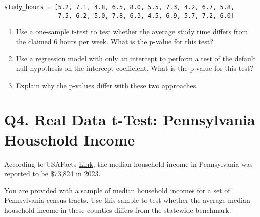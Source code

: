 \documentclass[12pt]{article}
\begin{document}
\begin{verbatim}
study_hours = [5.2, 7.1, 4.8, 6.5, 8.0, 5.5, 7.3, 4.2, 6.7, 5.8, 
               7.5, 6.2, 5.0, 7.8, 6.3, 4.5, 6.9, 5.7, 7.2, 6.0]
\end{verbatim}

\begin{enumerate}[label=\alph*)]
    \item Use a one-sample t-test to test whether the average study time differs from the claimed 6 hours per week. What is the p-value for this test?
    
    \vspace{3cm}
    
    \item Use a regression model with only an intercept to perform a test of the default null hypothesis on the intercept coefficient. What is the p-value for this test?
    
    \vspace{3cm}
    
    \item Explain why the p-values differ with these two approaches.
    
    \vspace{3cm}
\end{enumerate}

\section*{Q4. Real Data t-Test: Pennsylvania Household Income}

According to USAFacts 
\href{https://usafacts.org/answers/what-is-the-income-of-a-us-household/state/pennsylvania/}{Link}, the median household income in Pennsylvania was reported to be \$73{,}824 in 2023.

You are provided with a sample of median household incomes for a set of Pennsylvania census tracts. Use this sample to test whether the average median household income in these counties differs from the statewide benchmark.

\end{document}
